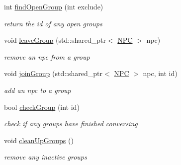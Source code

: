 \begin{DoxyCompactItemize}
int \hyperlink{class_room_a7d4ef90e7eb605f2c198b28175900d45}{find\+Open\+Group} (int exclude)
\begin{DoxyCompactList}\small\item\em return the id of any open groups \end{DoxyCompactList}\item 
void \hyperlink{class_room_af6bdbbf116aeafe290a31990a1124562}{leave\+Group} (std\+::shared\+\_\+ptr$<$ \hyperlink{class_n_p_c}{N\+PC} $>$ npc)
\begin{DoxyCompactList}\small\item\em remove an npc from a group \end{DoxyCompactList}\item 
void \hyperlink{class_room_a8cf434656fbafb4d65ee47c33db5c8ed}{join\+Group} (std\+::shared\+\_\+ptr$<$ \hyperlink{class_n_p_c}{N\+PC} $>$ npc, int id)
\begin{DoxyCompactList}\small\item\em add an npc to a group \end{DoxyCompactList}\item 
bool \hyperlink{class_room_a0c1e8e264493205408553a998a068b29}{check\+Group} (int id)
\begin{DoxyCompactList}\small\item\em check if any groups have finished conversing \end{DoxyCompactList}\item 
void \hyperlink{class_room_a03dc1536ef3b1ed301c76b08685e7103}{clean\+Up\+Groups} ()
\begin{DoxyCompactList}\small\item\em remove any inactive groups \end{DoxyCompactList}\end{DoxyCompactItemize}
